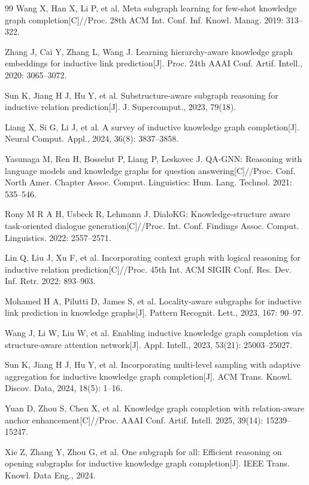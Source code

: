 \documentclass[preprint,12pt]{elsarticle}
\begin{document}
\begin{thebibliography}{99}
Wang X, Han X, Li P, et al.
Meta subgraph learning for few-shot knowledge graph completion[C]//Proc. 28th ACM Int. Conf. Inf. Knowl. Manag.
2019: 313–322.

Zhang J, Cai Y, Zhang L, Wang J.
Learning hierarchy-aware knowledge graph embeddings for inductive link prediction[J].
Proc. 24th AAAI Conf. Artif. Intell., 2020: 3065–3072.

Sun K, Jiang H J, Hu Y, et al.
Substructure-aware subgraph reasoning for inductive relation prediction[J]. J. Supercomput., 2023, 79(18).

Liang X, Si G, Li J, et al.
A survey of inductive knowledge graph completion[J]. Neural Comput. Appl., 2024, 36(8): 3837--3858.

Yasunaga M, Ren H, Bosselut P, Liang P, Leskovec J.
QA-GNN: Reasoning with language models and knowledge graphs for question answering[C]//Proc. Conf. North Amer. Chapter Assoc. Comput. Linguistics: Hum. Lang. Technol.
2021: 535–546.

Rony M R A H, Usbeck R, Lehmann J.
DialoKG: Knowledge-structure aware task-oriented dialogue generation[C]//Proc. Int. Conf. Findings Assoc. Comput. Linguistics.
2022: 2557–2571.

Lin Q, Liu J, Xu F, et al.
Incorporating context graph with logical reasoning for inductive relation prediction[C]//Proc. 45th Int. ACM SIGIR Conf. Res. Dev. Inf. Retr.
2022: 893--903.

Mohamed H A, Pilutti D, James S, et al.
Locality-aware subgraphs for inductive link prediction in knowledge graphs[J]. Pattern Recognit. Lett., 2023, 167: 90--97.

Wang J, Li W, Liu W, et al.
Enabling inductive knowledge graph completion via structure-aware attention network[J]. Appl. Intell., 2023, 53(21): 25003--25027.

Sun K, Jiang H J, Hu Y, et al.
Incorporating multi-level sampling with adaptive aggregation for inductive knowledge graph completion[J]. ACM Trans. Knowl. Discov. Data, 2024, 18(5): 1--16.

Yuan D, Zhou S, Chen X, et al.
Knowledge graph completion with relation-aware anchor enhancement[C]//Proc. AAAI Conf. Artif. Intell.
2025, 39(14): 15239--15247.

Xie Z, Zhang Y, Zhou G, et al.
One subgraph for all: Efficient reasoning on opening subgraphs for inductive knowledge graph completion[J]. IEEE Trans. Knowl. Data Eng., 2024.


\end{thebibliography}
\end{document}
